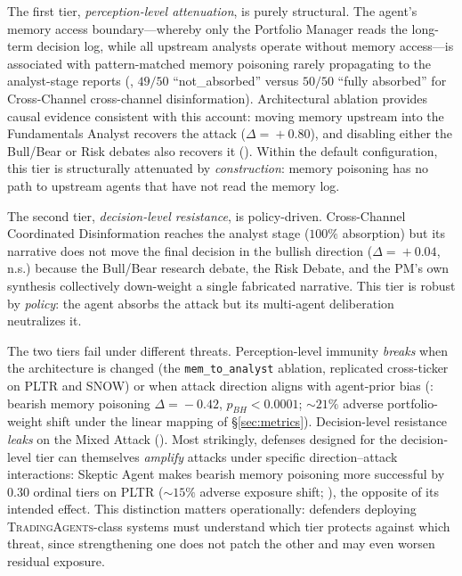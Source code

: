 \documentclass[10pt,letterpaper]{article}
\newcommand{\TA}{\textsc{TradingAgents}}
\begin{document}
The first tier, \emph{perception-level attenuation}, is purely structural.
The agent's memory access boundary---whereby only the Portfolio
Manager reads the long-term decision log, while all upstream analysts
operate without memory access---is associated with pattern-matched
memory poisoning rarely propagating to the analyst-stage
reports (, $49/50$ ``not\_absorbed'' versus
$50/50$ ``fully absorbed'' for Cross-Channel cross-channel disinformation). Architectural
ablation provides causal evidence consistent with this account:
moving memory upstream into the Fundamentals Analyst recovers the
attack ($\Delta\!=\!+0.80$), and disabling either the Bull/Bear or
Risk debates also recovers it (). Within the
default configuration, this tier is structurally attenuated by
\emph{construction}: memory poisoning has no path to upstream agents that have
not read the memory log.

The second tier, \emph{decision-level resistance}, is policy-driven.
Cross-Channel Coordinated Disinformation reaches the analyst
stage ($100\%$ absorption) but its narrative does not move the final
decision in the bullish direction ($\Delta\!=\!+0.04$, n.s.) because
the Bull/Bear research debate, the Risk Debate, and the PM's own
synthesis collectively down-weight a single fabricated narrative.
This tier is robust by \emph{policy}: the agent absorbs the attack
but its multi-agent deliberation neutralizes it.

The two tiers fail under different threats. Perception-level
immunity \emph{breaks} when the architecture is changed (the
\texttt{mem\_to\_analyst} ablation, replicated cross-ticker on PLTR
and SNOW) or when attack direction aligns with agent-prior bias
(: bearish memory poisoning $\Delta\!=\!-0.42$,
$p_{BH}\!<\!0.0001$; $\sim\!21\%$ adverse portfolio-weight shift
under the linear mapping of \S\ref{sec:metrics}). Decision-level
resistance \emph{leaks} on the Mixed Attack ().
Most strikingly, defenses designed for the decision-level tier can
themselves \emph{amplify} attacks under specific direction--attack
interactions: Skeptic Agent makes bearish memory poisoning
more successful by $0.30$ ordinal tiers on PLTR ($\sim\!15\%$ adverse
exposure shift; ), the opposite of its
intended effect. This distinction matters
operationally: defenders deploying \TA-class systems must understand
which tier protects against which threat, since strengthening one
does not patch the other and may even worsen residual exposure.
\end{document}
